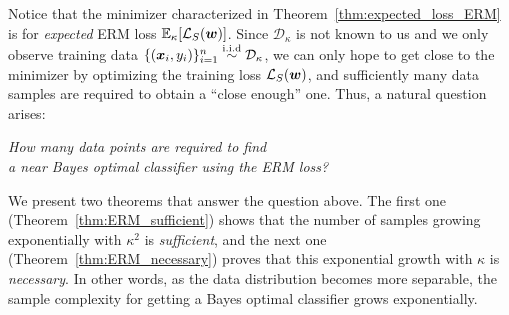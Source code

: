 Notice that the minimizer characterized in Theorem~\ref{thm:expected_loss_ERM} is for \emph{expected} ERM loss $\mathbb{E}_\kappa[\mathcal{L}_S({\bm{w}})]$. Since $\mathcal{D}_\kappa$ is not known to us and we only observe training data $ \{ ({\bm{x}}_i, y_i)\}_{i=1}^n \overset{\mathrm{i.i.d}}{\sim} \mathcal{D}_\kappa $, we can only hope to get close to the minimizer by optimizing the training loss $\mathcal{L}_S({\bm{w}})$, 
and sufficiently many data samples are required to obtain a ``close enough'' one.
Thus, a natural question arises:
\begin{center}
    \vspace{-5pt}
    \emph{How many data points are required to find \\
    a near Bayes optimal classifier using the ERM loss?}\\
\end{center}
We present two theorems that answer the question above. The first one (Theorem~\ref{thm:ERM_sufficient}) shows that the number of samples growing exponentially with $\kappa^2$ is \emph{sufficient}, and the next one (Theorem~\ref{thm:ERM_necessary}) proves that this exponential growth with $\kappa$ is \iffalse in fact \fi \emph{necessary}.
In other words, as the data distribution becomes more separable, the sample complexity for getting a Bayes optimal classifier grows exponentially. 

